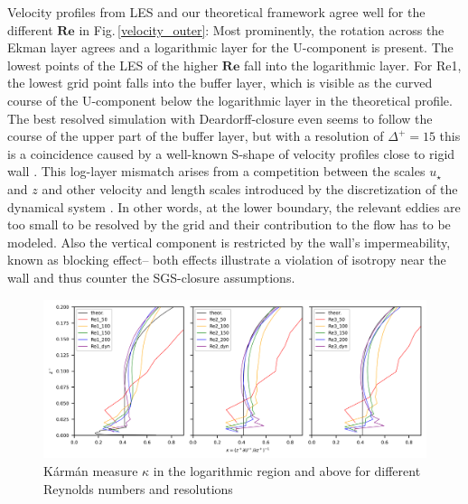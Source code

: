 \documentclass[a4paper,11pt]{article}
\newcommand{\RE}{\mathbf{Re}}
\begin{document}
Velocity profiles from LES and our theoretical framework agree well for the different $\RE$ in Fig.\,\ref{velocity_outer}: Most prominently, the rotation across the Ekman layer agrees and a logarithmic layer for the U-component is present. The lowest points of the LES of the higher $\RE$ fall into the logarithmic layer. For Re1, the lowest grid point falls into the buffer layer, which is visible as the curved course of the U-component below the logarithmic layer in the theoretical profile. The best resolved simulation with Deardorff-closure even seems to follow the course of the upper part of the buffer layer, but with a resolution of $\Delta^+=15$ this is a coincidence caused by a well-known S-shape of velocity profiles close to rigid wall \citep{brasseur2010designing}. This log-layer mismatch arises from a competition between the scales $u_\star$ and $z$ and other velocity and length scales introduced by the discretization of the dynamical system \citep{mason1992stochastic,brasseur2010designing}. In other words, at the lower boundary, the relevant eddies are too small to be resolved by the grid and their contribution to the flow has to be modeled. Also the vertical component is restricted by the wall's impermeability, known as blocking effect-- both effects illustrate a violation of isotropy near the wall and thus counter the SGS-closure assumptions.

\begin{figure}[ht]
  \centerline{
	  \includegraphics[width=\textwidth]{figures_2024/d3y_3Re_kappa}
  }
  \caption{K\'arm\'an measure $\kappa$ in the logarithmic region and above for different Reynolds numbers and resolutions}
  \label{fig:3Re_kappa}
\end{figure}
\end{document}
